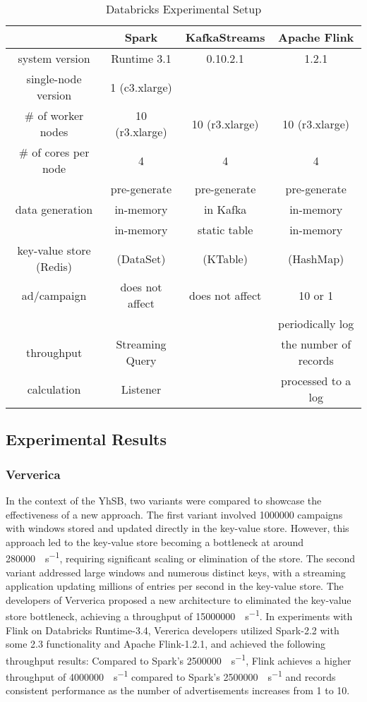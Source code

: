 \documentclass[runningheads]{llncs}
\begin{document}
  \begin{table}[ht]
  \centering
  \begin{tabular}{|c|c|c|c|}
  \hline
  & Spark & KafkaStreams & Apache Flink
  \\ \hline
  system version & Runtime 3.1 & 0.10.2.1 & 1.2.1
  \\ \hline
  single-node version & 1 (c3.xlarge) & & 
  \\ \hline
  \# of worker nodes & 10 (r3.xlarge) & 10 (r3.xlarge) & 10 (r3.xlarge)
  \\ \hline
  \# of cores per node & 4 & 4 & 4
  \\ \hline
  & pre-generate & pre-generate & pre-generate
  \\
  data generation & in-memory & in Kafka & in-memory
  \\ \hline
  & in-memory & static table & in-memory
  \\
  key-value store (Redis) & (DataSet) & (KTable) & (HashMap)
  \\
  ad/campaign & does not affect & does not affect & 10 or 1
  \\ \hline
  & & & periodically log
  \\
  throughput & Streaming Query & & the number of records
  \\
  calculation & Listener & & processed to a log
  \\ \hline
  \end{tabular}
  \caption{Databricks Experimental Setup}
  \end{table}

\subsection{Experimental Results}
\subsubsection{Ververica}
%
In the context of the \gls{YhSB}, two variants were compared to showcase the
effectiveness of a new approach. The first variant involved \num{1000000} 
campaigns with windows stored and updated directly in the key-value store. 
However, this approach led to the key-value store becoming a bottleneck at 
around \SI{280000}{\tuple\per\second}, requiring significant scaling or 
elimination of the store. The second variant addressed large windows and 
numerous distinct keys, with a streaming application updating
millions of entries per second in the key-value store. The developers of 
Ververica proposed a new architecture to eliminated the key-value store bottleneck, 
achieving a throughput of \SI{15000000}{\tuple\per\second}. 
%
In experiments with Flink on Databricks Runtime-3.4, Vererica developers utilized Spark-2.2 
with some 2.3 functionality and Apache Flink-1.2.1, and achieved the following throughput results: 
Compared to Spark's \SI{2500000}{\tuple\per\second}, Flink achieves a higher throughput 
of \SI{4000000}{\tuple\per\second} compared to Spark's \SI{2500000}{\tuple\per\second}
and records consistent performance as the number of advertisements increases from \num{1} to \num{10}.
%
\end{document}
